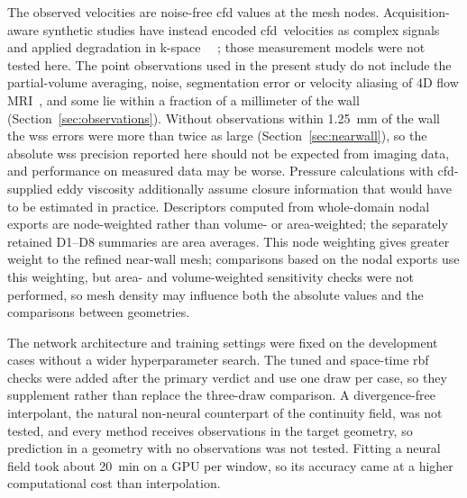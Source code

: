\documentclass[12pt,a4paper]{article}
\newcommand{\cfdrevision}[1]{#1} %
\newcommand{\CFD}{\ac{cfd}\xspace}
\newcommand{\WSS}{\ac{wss}\xspace}
\newcommand{\RBF}{\ac{rbf}\xspace}
\theoremstyle{definition}
\numberwithin{equation}{section}
\providecommand{\DIFaddtex}[1]{{\protect\color{blue} \sf #1}} %
\providecommand{\DIFdeltex}[1]{{\protect\color{red} \scriptsize #1}} %
\providecommand{\DIFaddbegin}{} %
\providecommand{\DIFaddend}{} %
\providecommand{\DIFdelbegin}{} %
\providecommand{\DIFdelend}{} %
\providecommand{\DIFadd}[1]{\texorpdfstring{\DIFaddtex{#1}}{#1}} %
\providecommand{\DIFdel}[1]{\texorpdfstring{\DIFdeltex{#1}}{}} %
\newcommand{\DIFscaledelfig}{0.5}
\newlength{\DIFdelgraphicswidth} %
\newlength{\DIFdelgraphicsheight} %
\newcommand{\DIFaddincludegraphics}[2][]{{\color{blue}\fbox{\DIFOincludegraphics[#1]{#2}}}} %
\newcommand{\DIFdelincludegraphics}[2][]{%
\sbox{\DIFdelgraphicsbox}{\DIFOincludegraphics[#1]{#2}}%
\settoboxwidth{\DIFdelgraphicswidth}{\DIFdelgraphicsbox} %
\settoboxtotalheight{\DIFdelgraphicsheight}{\DIFdelgraphicsbox} %
\scalebox{\DIFscaledelfig}{%
\parbox[b]{\DIFdelgraphicswidth}{\usebox{\DIFdelgraphicsbox}\\[-\baselineskip] \rule{\DIFdelgraphicswidth}{0em}}\llap{\resizebox{\DIFdelgraphicswidth}{\DIFdelgraphicsheight}{%
\setlength{\unitlength}{\DIFdelgraphicswidth}%
\begin{picture}(1,1)%
\thicklines\linethickness{2pt} %
{\color[rgb]{1,0,0}\put(0,0){\framebox(1,1){}}}%
{\color[rgb]{1,0,0}\put(0,0){\line( 1,1){1}}}%
{\color[rgb]{1,0,0}\put(0,1){\line(1,-1){1}}}%
\end{picture}%
}\hspace*{3pt}}} %
} %
\DeclareRobustCommand{\DIFaddbegin}{\DIFOaddbegin \let\includegraphics\DIFaddincludegraphics} %
\DeclareRobustCommand{\DIFaddend}{\DIFOaddend \let\includegraphics\DIFOincludegraphics} %
\DeclareRobustCommand{\DIFdelbegin}{\DIFOdelbegin \let\includegraphics\DIFdelincludegraphics} %
\DeclareRobustCommand{\DIFdelend}{\DIFOaddend \let\includegraphics\DIFOincludegraphics} %
\renewcommand{\DIFaddtex}[1]{{\protect\color{red}#1}}
\renewcommand{\DIFdeltex}[1]{}
\renewcommand{\DIFdel}[1]{}
\renewcommand{\DIFaddincludegraphics}[2][]{\DIFOincludegraphics[#1]{#2}}
\renewcommand{\DIFdelincludegraphics}[2][]{}
\renewcommand{\cfdrevision}[1]{\textcolor{red}{#1}}
\def\DIFaddbegin{}\def\DIFaddend{}%
\def\DIFdelbegin{}\def\DIFdelend{}%
\def\cfdrevision#1{#1}%
\begin{document}
The observed velocities are noise-free \CFD values at the mesh nodes. \DIFdelbegin \DIFdel{They }\DIFdelend \DIFaddbegin \DIFadd{Acquisition-aware synthetic studies have instead encoded }\CFD{}\ \DIFadd{velocities as complex signals and applied degradation in k-space~\mbox{%
\cite{ferdian2020fourflownet,saitta2024implicit}}\hskip0pt%
; those measurement models were not tested here. The point observations used in the present study }\DIFaddend do not include the partial-volume averaging, noise, segmentation error or velocity aliasing of 4D flow MRI~\cite{markl2012fourd}, and some lie within a fraction of a millimeter of the wall (Section~\ref{sec:observations}). Without observations within 1.25~mm of the wall the \WSS errors were more than twice as large (Section~\ref{sec:nearwall}), so the absolute \WSS precision reported here should not be expected from imaging data, and performance on measured data may be worse. Pressure calculations with \CFD-supplied eddy viscosity additionally assume closure information that would have to be estimated in practice. \DIFdelbegin \DIFdel{The exported fields are nodal, so all descriptors are node-weighted rather than volume- or area-weighted, which }\DIFdelend \DIFaddbegin \DIFadd{\cfdrevision{Descriptors computed from whole-domain nodal exports are node-weighted rather than volume- or area-weighted; the separately retained D1--D8 summaries are area averages. This node weighting} }\DIFaddend gives greater weight to the refined near-wall mesh; \DIFdelbegin \DIFdel{the same weighting applies to every geometry, so the comparisons between cases are unaffected, while the absolute values should be read as nodal summaries.
}\DIFdelend \DIFaddbegin \DIFadd{\cfdrevision{comparisons based on the nodal exports use this weighting, but area- and volume-weighted sensitivity checks were not performed, so mesh density may influence both the absolute values and the comparisons between geometries.}
}\DIFaddend 

The network architecture and training settings were fixed on the development cases without a wider hyperparameter search. The tuned and space-time \RBF checks were added after the primary verdict and use one draw per case, so they supplement rather than replace the three-draw comparison. A divergence-free interpolant, the natural non-neural counterpart of the continuity field, was not tested, and every method receives observations in the target geometry, so prediction in a geometry with no observations was not tested. Fitting a neural field took about 20~min on a GPU per window, so its accuracy came at a higher computational cost than interpolation.
\end{document}
